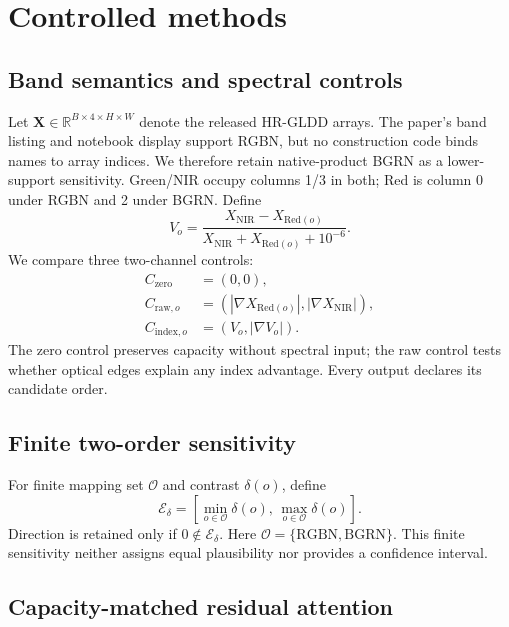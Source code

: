 \section{Controlled methods}
\label{sec:method}

\subsection{Band semantics and spectral controls}

Let $\mathbf{X}\in\mathbb{R}^{B\times4\times H\times W}$ denote the released
HR-GLDD arrays. The paper's band listing and notebook display support RGBN, but
no construction code binds names to array indices. We therefore retain
native-product BGRN as a lower-support sensitivity. Green/NIR occupy columns
1/3 in both; Red is column 0 under RGBN and 2 under BGRN. Define
\begin{equation}
V_o=\frac{X_{\mathrm{NIR}}-X_{\mathrm{Red}(o)}}
        {X_{\mathrm{NIR}}+X_{\mathrm{Red}(o)}+10^{-6}}.
\end{equation}
We compare three two-channel controls:
\begin{align}
C_{\mathrm{zero}} &= (0,0),\\
C_{\mathrm{raw},o} &= (|\nabla X_{\mathrm{Red}(o)}|,|\nabla X_{\mathrm{NIR}}|),\\
C_{\mathrm{index},o} &= (V_o,|\nabla V_o|).
\end{align}
The zero control preserves capacity without spectral input; the raw control
tests whether optical edges explain any index advantage. Every output declares
its candidate order.

\subsection{Finite two-order sensitivity}

For finite mapping set $\mathcal{O}$ and contrast $\delta(o)$, define
\begin{equation}
\mathcal{E}_{\delta}=
\left[\min_{o\in\mathcal{O}}\delta(o),\,
      \max_{o\in\mathcal{O}}\delta(o)\right].
\end{equation}
Direction is retained only if $0\notin\mathcal{E}_{\delta}$. Here
$\mathcal{O}=\{\mathrm{RGBN},\mathrm{BGRN}\}$. This finite sensitivity neither
assigns equal plausibility nor provides a confidence interval.

\subsection{Capacity-matched residual attention}

